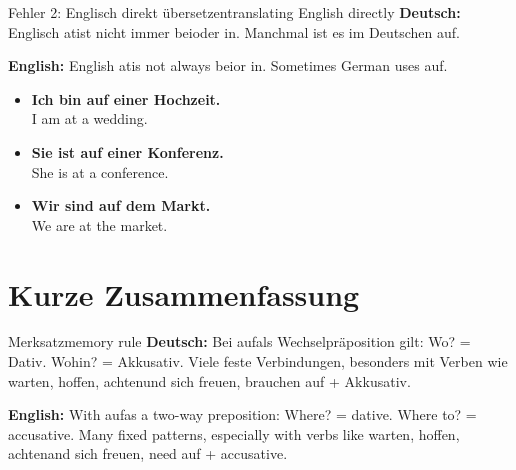 \documentclass[a4paper,11pt]{article}
\newcommand{\GermanText}[1]{\textbf{Deutsch: }#1\par}
\newcommand{\EnglishText}[1]{{\small\color{SoftGray}\textbf{English: }#1\par}}
\newcommand{\ExampleItem}[2]{\item \textbf{#1}\\{\small\color{SoftGray}#2}}
\begin{document}
    \begin{grammarentry}{Fehler 2: Englisch direkt übersetzen}{translating English directly}
        \GermanText{Englisch \glqq at\grqq ist nicht immer \glqq bei\grqq oder \glqq in\grqq. Manchmal ist es im Deutschen \glqq auf\grqq.}
        \EnglishText{English \glqq at\grqq is not always \glqq bei\grqq or \glqq in\grqq. Sometimes German uses \glqq auf\grqq.}

        \begin{exbox}
            \begin{itemize}
                \ExampleItem{Ich bin auf einer Hochzeit.}{I am at a wedding.}
                \ExampleItem{Sie ist auf einer Konferenz.}{She is at a conference.}
                \ExampleItem{Wir sind auf dem Markt.}{We are at the market.}
            \end{itemize}
        \end{exbox}
    \end{grammarentry}

    \section{Kurze Zusammenfassung}

    \begin{grammarentry}{Merksatz}{memory rule}
        \GermanText{Bei \glqq auf\grqq als Wechselpräposition gilt: Wo? = Dativ. Wohin? = Akkusativ. Viele feste Verbindungen, besonders mit Verben wie \glqq warten\grqq, \glqq hoffen\grqq, \glqq achten\grqq und \glqq sich freuen\grqq, brauchen \glqq auf + Akkusativ\grqq.}
        \EnglishText{With \glqq auf\grqq as a two-way preposition: Where? = dative. Where to? = accusative. Many fixed patterns, especially with verbs like \glqq warten\grqq, \glqq hoffen\grqq, \glqq achten\grqq and \glqq sich freuen\grqq, need \glqq auf + accusative\grqq.}
    \end{grammarentry}
\end{document}
